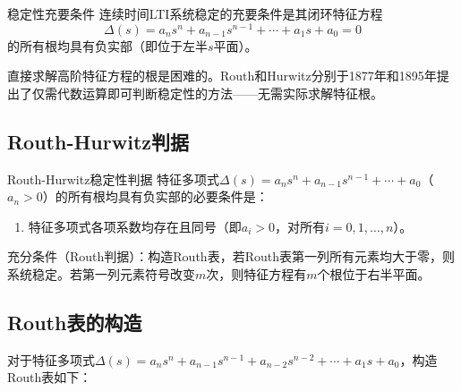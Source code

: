 \begin{myTheorem}{稳定性充要条件}
连续时间LTI系统稳定的充要条件是其闭环特征方程
\[
\Delta(s) = a_n s^n + a_{n-1}s^{n-1} + \cdots + a_1 s + a_0 = 0
\]
的所有根均具有负实部（即位于左半$s$平面）。
\end{myTheorem}

直接求解高阶特征方程的根是困难的。Routh和Hurwitz分别于1877年和1895年提出了仅需代数运算即可判断稳定性的方法——无需实际求解特征根。

\subsection{Routh-Hurwitz判据}

\begin{myTheorem}{Routh-Hurwitz稳定性判据}
特征多项式$\Delta(s) = a_n s^n + a_{n-1}s^{n-1} + \cdots + a_0$（$a_n > 0$）的所有根均具有负实部的必要条件是：
\begin{enumerate}
\item 特征多项式各项系数均存在且同号（即$a_i > 0$，对所有$i = 0,1,\dots,n$）。
\end{enumerate}
充分条件（Routh判据）：构造Routh表，若Routh表第一列所有元素均大于零，则系统稳定。若第一列元素符号改变$m$次，则特征方程有$m$个根位于右半平面。
\end{myTheorem}

\subsection{Routh表的构造}

对于特征多项式$\Delta(s) = a_n s^n + a_{n-1}s^{n-1} + a_{n-2}s^{n-2} + \cdots + a_1 s + a_0$，构造Routh表如下：


